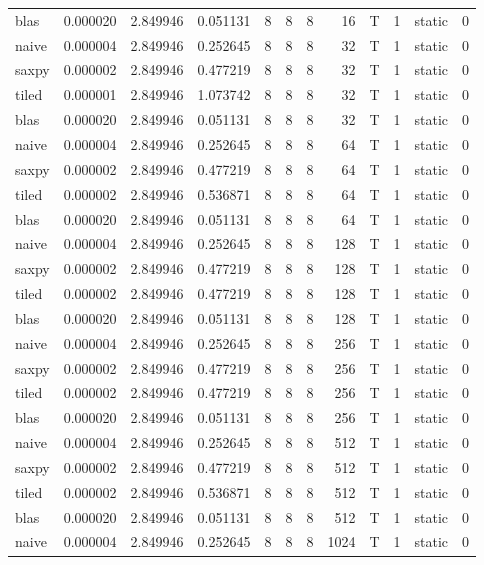 \documentclass[
  12pt,
  xcolor = usenames,dvipsnames]{article}
\begin{document}
\begin{table}[!h]
{\begin{tabular}[t]{lrrrrrrrlrlr}
blas & 0.000020 & 2.849946 & 0.051131 & 8 & 8 & 8 & 16 & T & 1 & static & 0\\
naive & 0.000004 & 2.849946 & 0.252645 & 8 & 8 & 8 & 32 & T & 1 & static & 0\\
saxpy & 0.000002 & 2.849946 & 0.477219 & 8 & 8 & 8 & 32 & T & 1 & static & 0\\
\addlinespace
tiled & 0.000001 & 2.849946 & 1.073742 & 8 & 8 & 8 & 32 & T & 1 & static & 0\\
blas & 0.000020 & 2.849946 & 0.051131 & 8 & 8 & 8 & 32 & T & 1 & static & 0\\
naive & 0.000004 & 2.849946 & 0.252645 & 8 & 8 & 8 & 64 & T & 1 & static & 0\\
saxpy & 0.000002 & 2.849946 & 0.477219 & 8 & 8 & 8 & 64 & T & 1 & static & 0\\
tiled & 0.000002 & 2.849946 & 0.536871 & 8 & 8 & 8 & 64 & T & 1 & static & 0\\
\addlinespace
blas & 0.000020 & 2.849946 & 0.051131 & 8 & 8 & 8 & 64 & T & 1 & static & 0\\
naive & 0.000004 & 2.849946 & 0.252645 & 8 & 8 & 8 & 128 & T & 1 & static & 0\\
saxpy & 0.000002 & 2.849946 & 0.477219 & 8 & 8 & 8 & 128 & T & 1 & static & 0\\
tiled & 0.000002 & 2.849946 & 0.477219 & 8 & 8 & 8 & 128 & T & 1 & static & 0\\
blas & 0.000020 & 2.849946 & 0.051131 & 8 & 8 & 8 & 128 & T & 1 & static & 0\\
\addlinespace
naive & 0.000004 & 2.849946 & 0.252645 & 8 & 8 & 8 & 256 & T & 1 & static & 0\\
saxpy & 0.000002 & 2.849946 & 0.477219 & 8 & 8 & 8 & 256 & T & 1 & static & 0\\
tiled & 0.000002 & 2.849946 & 0.477219 & 8 & 8 & 8 & 256 & T & 1 & static & 0\\
blas & 0.000020 & 2.849946 & 0.051131 & 8 & 8 & 8 & 256 & T & 1 & static & 0\\
naive & 0.000004 & 2.849946 & 0.252645 & 8 & 8 & 8 & 512 & T & 1 & static & 0\\
\addlinespace
saxpy & 0.000002 & 2.849946 & 0.477219 & 8 & 8 & 8 & 512 & T & 1 & static & 0\\
tiled & 0.000002 & 2.849946 & 0.536871 & 8 & 8 & 8 & 512 & T & 1 & static & 0\\
blas & 0.000020 & 2.849946 & 0.051131 & 8 & 8 & 8 & 512 & T & 1 & static & 0\\
naive & 0.000004 & 2.849946 & 0.252645 & 8 & 8 & 8 & 1024 & T & 1 & static & 0\\

\end{tabular}}
\end{table}
\end{document}
